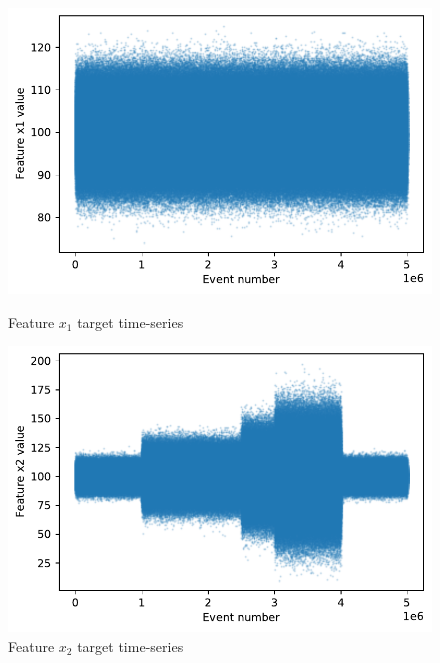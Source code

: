\begin{figure}[!htb] 
  \begin{minipage}[b]{0.5\linewidth}
    \centering
    \includegraphics[width=1\linewidth]{figures/timeseries-t6-x1.pdf} 
    \caption{Feature $x_1$ target time-series} 
    \label{fig:timeseries-t6-x1} 
    \vspace{4ex}
  \end{minipage}%
  \begin{minipage}[b]{0.5\linewidth}
    \centering
    \includegraphics[width=1\linewidth]{figures/timeseries-t6-x2.pdf} 
    \caption{Feature $x_2$ target time-series} 
    \label{fig:timeseries-t6-x2} 
    \vspace{4ex}
  \end{minipage} 
  \begin{minipage}[b]{0.5\linewidth}
    \centering

\end{minipage}
\end{figure}
